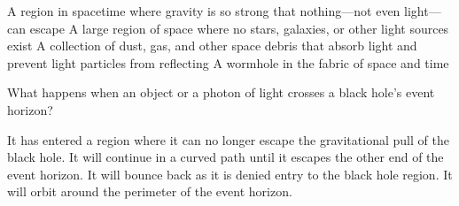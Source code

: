 \documentclass{exam}
\begin{document}
\begin{questions}
\begin{randomizechoices}
    \correctchoice A region in spacetime where gravity is so strong that nothing---not even light---can escape
    \choice A large region of space where no stars, galaxies, or other light sources exist
    \choice A collection of dust, gas, and other space debris that absorb light and prevent light particles from reflecting
    \choice A wormhole in the fabric of space and time
\end{randomizechoices}

\question
What happens when an object or a photon of light crosses a black hole's event horizon?

\begin{randomizechoices}
    \correctchoice It has entered a region where it can no longer escape the gravitational pull of the black hole.
    \choice It will continue in a curved path until it escapes the other end of the event horizon.
    \choice It will bounce back as it is denied entry to the black hole region.
    \choice It will orbit around the perimeter of the event horizon.
\end{randomizechoices}



\end{questions}
\end{document}

